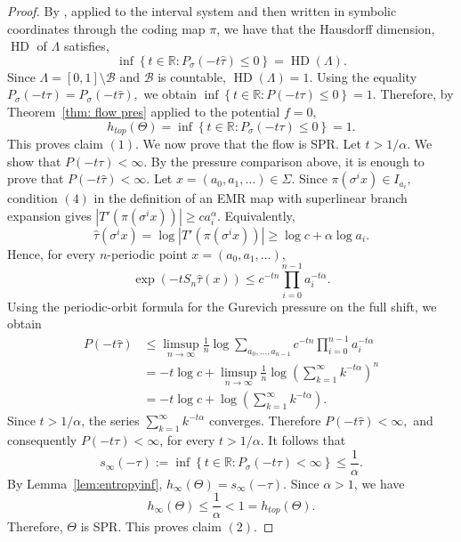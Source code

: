 \documentclass[letterpaper,11pt]{amsart}
\numberwithin{equation}{section}     %
\def\le{\leqslant}
\def\ge{\geqslant}
\begin{document}
\begin{proof}
By \cite[Theorem~4.2.13]{mubook}, applied to the interval system and then
written in symbolic coordinates through the coding map $ \pi$, we have that the Hausdorff dimension, $\operatorname{HD}$ of $\Lambda$ satisfies, 
\[
\inf\left\{
t\in\mathbb R:
P_\sigma(-t\widehat\tau)\le 0
\right\}
=
\operatorname{HD}(\Lambda).
\]
Since \(\Lambda=[0,1]\setminus\mathcal B\) and \(\mathcal B\) is countable, $\operatorname{HD}(\Lambda)=1.$
Using the equality $P_\sigma(-t\tau)=P_\sigma(-t\widehat\tau),$
we obtain
$\inf\left\{t\in\mathbb R:P(-t\tau)\le 0\right\}=1.$
Therefore, by Theorem~\ref{thm: flow pres} applied to the potential \(f=0\),
\[
h_{top}(\Theta) =\inf\left\{t\in\mathbb R:P_\sigma(-t\tau)\le 0\right\}=1.
\]
This proves claim $(1)$. We now prove that the flow is SPR. Let $t>1/\alpha$. We show that $P(-t\tau)<\infty.$
By the pressure comparison above, it is enough to prove that $P(-t\widehat\tau)<\infty$. Let $x=(a_0,a_1,\ldots)\in\Sigma$. Since $\pi(\sigma^i x)\in I_{a_i},$ condition $(4)$ in the definition of an EMR map with superlinear branch expansion gives $|T'(\pi(\sigma^i x))| \ge c a_i^{\alpha}.$
Equivalently,
\[
\widehat\tau(\sigma^i x)
=
\log |T'(\pi(\sigma^i x))|
\ge
\log c+\alpha\log a_i .
\]
Hence, for every \(n\)-periodic point \(x=(a_0,a_1,\ldots)\),
\[
\exp\left(-tS_n\widehat\tau(x)\right)
\le
c^{-tn}
\prod_{i=0}^{n-1}a_i^{-t\alpha}.
\]
Using the periodic-orbit formula for the Gurevich pressure on the full shift,
we obtain
\[
\begin{aligned}
P(-t\widehat\tau)
&\le
\limsup_{n\to\infty}
\frac1n
\log
\sum_{a_0,\ldots,a_{n-1}}
c^{-tn}
\prod_{i=0}^{n-1}a_i^{-t\alpha}  \\
&=
-t\log c
+
\limsup_{n\to\infty}
\frac1n
\log
\left(
\sum_{k=1}^{\infty}k^{-t\alpha}
\right)^n  \\
&=
-t\log c
+
\log
\left(
\sum_{k=1}^{\infty}k^{-t\alpha}
\right).
\end{aligned}
\]
Since $t>1/\alpha$, the series
$\sum_{k=1}^{\infty}k^{-t\alpha}$
converges. Therefore
$P(-t\widehat\tau)<\infty,$
and consequently $P(-t\tau)<\infty$, for every $t>1/\alpha$.
It follows that
\[
s_\infty(-\tau)
:=
\inf\left\{
t\in\mathbb R:
P_\sigma(-t\tau)<\infty
\right\}
\le
\frac1{\alpha}.
\]
By Lemma~\ref{lem:entropyinf}, $h_\infty(\Theta)=s_\infty(-\tau).$ Since $\alpha>1$, we have
\[
h_\infty(\Theta)
\le
\frac1{\alpha}
<
1
=
h_{top}(\Theta).
\]
Therefore, $\Theta$ is SPR. This proves claim $(2)$.
\end{proof}
\end{document}
